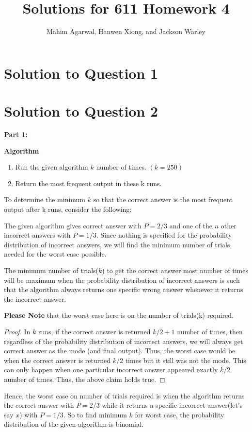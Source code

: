\documentclass[11pt]{article}
\title{Solutions for 611 Homework 4}
\author{Mahim Agarwal, Hanwen Xiong, and Jackson Warley}
\begin{document}
\maketitle

\section{Solution to Question 1}



\section{Solution to Question 2}

\textbf{Part 1:}

\textbf{Algorithm}
\begin{enumerate}
	\item Run the given algorithm $k$ number of times. $(k = 250)$
	\item Return the most frequent output in these k runs.
\end{enumerate}
To determine the minimum $k$ so that the correct answer is the most frequent output after k runs, consider the following:

The given algorithm gives correct answer with $P = 2/3$ and one of the $n$ other incorrect answers with $P = 1/3$.
Since nothing is specified for the probability distribution of incorrect answers, we will find the minimum number of trials needed for the worst case possible. 

 The minimum number of trials($k$) to get the correct answer most number of times will be maximum when the probability distribution of incorrect answers is such that the algorithm always returns one specific wrong answer whenever it returns
the incorrect answer.

\textbf{Please Note} that the worst case here is on the number of trials(k) required.

\begin{proof}
	In $k$ runs, if the correct answer is returned $k/2+1$ number of times, then regardless of the probability distribution of incorrect answers, we will always get correct answer as the mode (and final output). Thus, the worst case would be when the correct answer is returned $k/2$ times but it still was not the mode. This can only happen when one particular incorrect answer appeared exactly $k/2$ number of times. \newline
	Thus, the above claim holds true.
\end{proof}
Hence, the worst case on number of trials required is when the algorithm returns the correct answer with $P = 2/3$ while it returns a specific incorrect answer(let's say $x$) with $P = 1/3$. \newline
So to find minimum $k$ for worst case, the probability distribution of the given algorithm is binomial.
\end{document}
